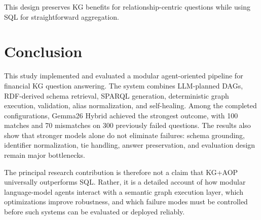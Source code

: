 \documentclass[11pt]{article}
\begin{document}
This design preserves KG benefits for relationship-centric questions while using SQL for straightforward aggregation.

\section{Conclusion}

This study implemented and evaluated a modular agent-oriented pipeline for financial KG question answering. The system combines LLM-planned DAGs, RDF-derived schema retrieval, SPARQL generation, deterministic graph execution, validation, alias normalization, and self-healing. Among the completed configurations, Gemma26 Hybrid achieved the strongest outcome, with 100 matches and 70 mismatches on 300 previously failed questions. The results also show that stronger models alone do not eliminate failures: schema grounding, identifier normalization, tie handling, answer preservation, and evaluation design remain major bottlenecks.

The principal research contribution is therefore not a claim that KG+AOP universally outperforms SQL. Rather, it is a detailed account of how modular language-model agents interact with a semantic graph execution layer, which optimizations improve robustness, and which failure modes must be controlled before such systems can be evaluated or deployed reliably.
\end{document}
